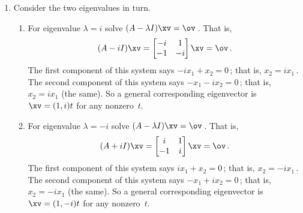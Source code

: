 \begin{example}
\begin{solution}
\begin{enumerate}
\item Consider the two eigenvalues in turn.
\begin{enumerate}
\item For eigenvalue \(\lambda=i\) solve \((A-\lambda I)\xv=\ov\)\,.  That is,
\begin{equation*}
(A-iI)\xv
=\begin{bmatrix} -i&1\\
-1&-i \end{bmatrix}\xv
=\ov\,.
\end{equation*}
The first component of this system says \(-ix_1+x_2=0\)\,; that is, \(x_2=ix_1\)\,.  
The second component of this system says \(-x_1-ix_2=0\)\,; that is, \(x_2=ix_1\) (the same).  
So a general corresponding eigenvector is \(\xv=(1,i)t\) for any nonzero~\(t\).
\item For eigenvalue \(\lambda=-i\) solve \((A-\lambda I)\xv=\ov\)\,.  That is,
\begin{equation*}
(A+iI)\xv
=\begin{bmatrix} i&1\\
-1&i \end{bmatrix}\xv
=\ov\,.
\end{equation*}
The first component of this system says \(ix_1+x_2=0\)\,; that is, \(x_2=-ix_1\)\,.  
The second component of this system says \(-x_1+ix_2=0\)\,; that is, \(x_2=-ix_1\) (the same).  
So a general corresponding eigenvector is \(\xv=(1,-i)t\) for any nonzero~\(t\).
\end{enumerate}
\end{enumerate}
\end{solution}
\end{example}



